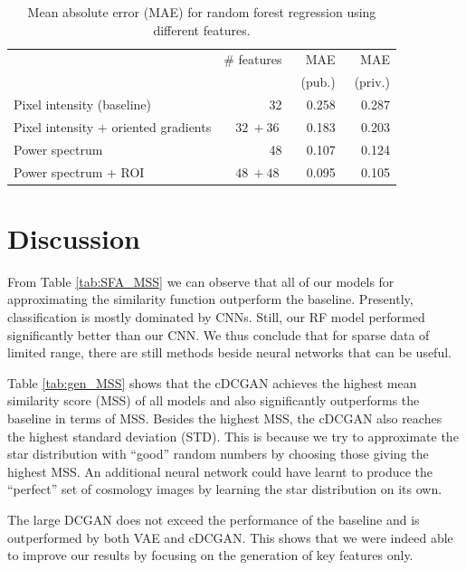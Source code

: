 \documentclass[10pt,conference,compsocconf]{IEEEtran}
\begin{document}
\begin{table}\centering
    \begin{tabular}{lrrr}
    \toprule
        & \# features & MAE & MAE \\
        & & ~(pub.) & ~(priv.) \\
    \midrule
        Pixel intensity (baseline) & \SI{32}{} & \SI{0.258}{} & \SI{0.287}{}  \\
        Pixel intensity + oriented gradients & $\SI{32}{} + \SI{36}{}$ & \SI{0.183}{} & \SI{0.203}{} \\
        Power spectrum & \SI{48}{} & \SI{0.107}{} & \SI{0.124}{} \\
        Power spectrum + ROI & $\SI{48}{} + \SI{48}{}$ & \SI{0.095}{} & \SI{0.105}{} \\
    \bottomrule
    \end{tabular}
\caption{Mean absolute error (MAE) for random forest regression using different features.}
\label{tab:RF}
\end{table}

\section{Discussion}

From Table \ref{tab:SFA_MSS} we can observe that all of our models for approximating the similarity function outperform the baseline. Presently, classification is mostly dominated by CNNs. Still, our RF model performed significantly better than our CNN. We thus conclude that for sparse data of limited range, there are still methods beside neural networks that can be useful. 

Table \ref{tab:gen_MSS} shows that the cDCGAN achieves the highest mean similarity score (MSS) of all models and also significantly outperforms the baseline in terms of MSS. Besides the highest MSS, the cDCGAN also reaches the highest standard deviation (STD). This is because we try to approximate the star distribution with ``good'' random numbers by choosing those giving the highest MSS. An additional neural network could have learnt to produce the ``perfect'' set of cosmology images by learning the star distribution on its own. %

The large DCGAN does not exceed the performance of the baseline and is outperformed by both VAE and cDCGAN. This shows that we were indeed able to improve our results by focusing on the generation of key features only.


\end{document}
